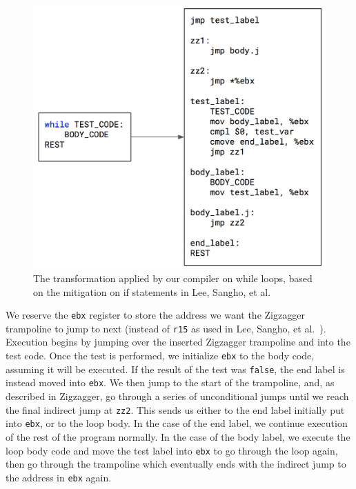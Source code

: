 \documentclass[sigplan, review]{acmart}
\begin{document}
\begin{figure}[bhp]
\includegraphics[width=\columnwidth]{./while_zigzagger.png}
\caption{The transformation applied by our compiler on while loops, based on the mitigation on if statements in Lee, Sangho, et al.}
\label{fig:while_zigzagger}
\end{figure}

We reserve the \texttt{ebx} register to store the address we want the Zigzagger trampoline to jump to next (instead of \texttt{r15} as used in Lee, Sangho, et al.~\cite{lee2016inferring}). Execution begins by jumping over the inserted Zigzagger trampoline and into the test code. Once the test is performed, we initialize \texttt{ebx} to the body code, assuming it will be executed. If the result of the test was \texttt{false}, the end label is instead moved into \texttt{ebx}. We then jump to the start of the trampoline, and, as described in Zigzagger, go through a series of unconditional jumps until we reach the final indirect jump at \texttt{zz2}. This sends us either to the end label initially put into \texttt{ebx}, or to the loop body. In the case of the end label, we continue execution of the rest of the program normally. In the case of the body label, we execute the loop body code and move the test label into \texttt{ebx} to go through the loop again, then go through the trampoline which eventually ends with the indirect jump to the address in \texttt{ebx} again.
\end{document}
